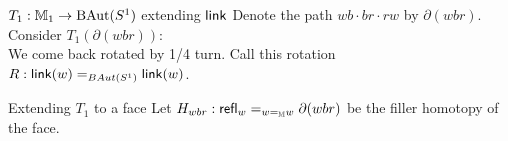 \begin{frame}{\( T_1:\mathbb{M}_1\to\operatorname{BAut}(S^1) \) extending \( \operatorname{\mathsf{link}} \)}
Denote the path \( wb\cdot br\cdot rw \) by \alert{\( \partial(wbr) \)}.
Consider \( T_1(\partial(wbr)) \):
\[\]
We come back rotated by 1/4 turn. Call this rotation \( R:\operatorname{\mathsf{link}}(w)=_{BAut(S^1)}\operatorname{\mathsf{link}}(w) \).
\end{frame}

\begin{frame}{Extending \( T_1 \) to a face}
Let \( H_{wbr}:\mathsf{refl}_{w}=_{w=_{\mathbb{M}}w}\partial(wbr) \) be the filler homotopy of the face.




\[\]
\end{frame}

% 
% 

